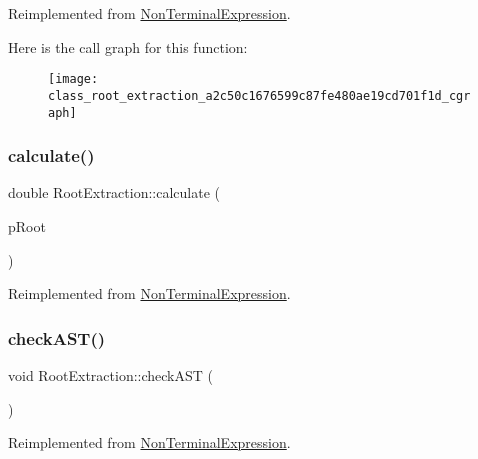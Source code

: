 Reimplemented from \mbox{\hyperlink{class_non_terminal_expression_aa65153b69523e01d86893f6d7b7fc480}{Non\+Terminal\+Expression}}.

Here is the call graph for this function\+:
\nopagebreak
\begin{figure}[H]
\begin{center}
\leavevmode
\texttt{[image: class\_root\_extraction\_a2c50c1676599c87fe480ae19cd701f1d\_cgraph]}
\end{center}
\end{figure}
\mbox{\label{class_root_extraction_ac1c92d2ec68a385f64c828a1a2ff94fa}} 
\subsubsection{\texorpdfstring{calculate()}{calculate()}}
{\footnotesize\ttfamily double Root\+Extraction\+::calculate (\begin{DoxyParamCaption}\item[{std\+::unique\+\_\+ptr$<$ \mbox{\hyperlink{class_abstract_expression}{Abstract\+Expression}} $>$ \&}]{p\+Root }\end{DoxyParamCaption})\hspace{0.3cm}{\ttfamily [virtual]}}



Reimplemented from \mbox{\hyperlink{class_non_terminal_expression_a41f5031f53384915aef5c19a88671afe}{Non\+Terminal\+Expression}}.

\mbox{\label{class_root_extraction_aadc4dbcddb8993df4556b08543ab5d3a}} 
\subsubsection{\texorpdfstring{checkAST()}{checkAST()}}
{\footnotesize\ttfamily void Root\+Extraction\+::check\+A\+ST (\begin{DoxyParamCaption}{ }\end{DoxyParamCaption})\hspace{0.3cm}{\ttfamily [virtual]}}



Reimplemented from \mbox{\hyperlink{class_non_terminal_expression_a04d61bbfb066afe1c603396e9e69c397}{Non\+Terminal\+Expression}}.

